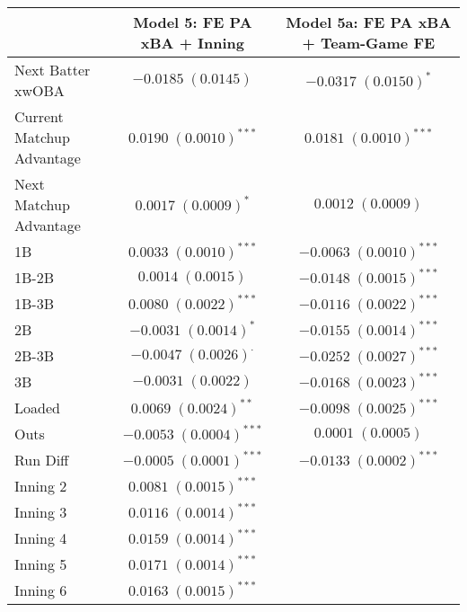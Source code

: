 
\begin{table}
\begin{center}
\begin{tabular}{l c c}
\hline
 & Model 5: FE PA xBA + Inning & Model 5a: FE PA xBA + Team-Game FE \\
\hline
Next Batter xwOBA                & $-0.0185 \; (0.0145)$         & $-0.0317 \; (0.0150)^{*}$   \\
Current Matchup Advantage        & $0.0190 \; (0.0010)^{***}$    & $0.0181 \; (0.0010)^{***}$  \\
Next Matchup Advantage           & $0.0017 \; (0.0009)^{*}$      & $0.0012 \; (0.0009)$        \\
1B                               & $0.0033 \; (0.0010)^{***}$    & $-0.0063 \; (0.0010)^{***}$ \\
1B-2B                            & $0.0014 \; (0.0015)$          & $-0.0148 \; (0.0015)^{***}$ \\
1B-3B                            & $0.0080 \; (0.0022)^{***}$    & $-0.0116 \; (0.0022)^{***}$ \\
2B                               & $-0.0031 \; (0.0014)^{*}$     & $-0.0155 \; (0.0014)^{***}$ \\
2B-3B                            & $-0.0047 \; (0.0026)^{\cdot}$ & $-0.0252 \; (0.0027)^{***}$ \\
3B                               & $-0.0031 \; (0.0022)$         & $-0.0168 \; (0.0023)^{***}$ \\
Loaded                           & $0.0069 \; (0.0024)^{**}$     & $-0.0098 \; (0.0025)^{***}$ \\
Outs                             & $-0.0053 \; (0.0004)^{***}$   & $0.0001 \; (0.0005)$        \\
Run Diff                         & $-0.0005 \; (0.0001)^{***}$   & $-0.0133 \; (0.0002)^{***}$ \\
Inning 2                         & $0.0081 \; (0.0015)^{***}$    &                             \\
Inning 3                         & $0.0116 \; (0.0014)^{***}$    &                             \\
Inning 4                         & $0.0159 \; (0.0014)^{***}$    &                             \\
Inning 5                         & $0.0171 \; (0.0014)^{***}$    &                             \\
Inning 6                         & $0.0163 \; (0.0015)^{***}$    &                             \\

\end{tabular}
\end{center}
\end{table}
